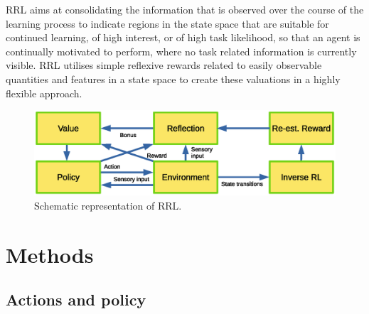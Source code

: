 \documentclass{article}
\begin{document}



RRL aims at consolidating the information that is observed over the course of the learning process to indicate regions in the state space that are suitable for continued learning, of high interest, or of high task likelihood, so that an agent is continually motivated to perform, where no task related information is currently visible.
RRL utilises simple reflexive rewards related to easily observable quantities and features in a state space to create these valuations in a highly flexible approach.

\begin{figure}[ht] 
\centering
\includegraphics[width=0.75\linewidth]{pics/figure1_IRRL.eps}
	\caption{Schematic representation of RRL.\label{irrlfig}}
\end{figure}

\section{Methods\label{Methods}}
\subsection{Actions and policy\label{Actions_etc}}
\end{document}
